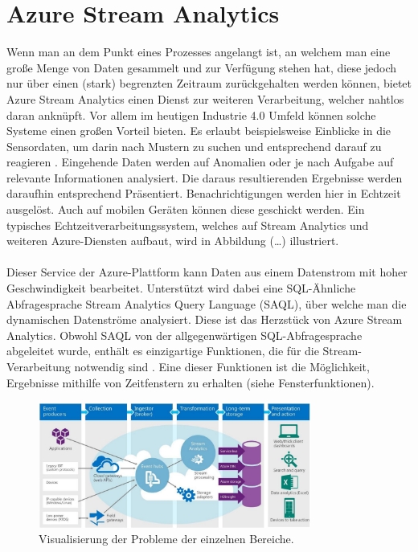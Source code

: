 \section{Azure Stream Analytics}
Wenn man an dem Punkt eines Prozesses angelangt ist, an welchem man eine große Menge von Daten gesammelt und zur Verfügung stehen hat, diese jedoch nur über einen (stark) begrenzten Zeitraum zurückgehalten werden können, bietet Azure Stream Analytics einen Dienst zur weiteren Verarbeitung, welcher nahtlos daran anknüpft. Vor allem im heutigen Industrie 4.0 Umfeld können solche Systeme einen großen Vorteil bieten. Es erlaubt beispielsweise Einblicke in die Sensordaten, um darin nach Mustern zu suchen und entsprechend darauf zu reagieren \cite{Klein.2017}. Eingehende Daten werden auf Anomalien oder je nach Aufgabe auf relevante Informationen analysiert. Die daraus resultierenden Ergebnisse werden daraufhin entsprechend Präsentiert. Benachrichtigungen werden hier in Echtzeit ausgelöst. Auch auf mobilen Geräten können diese geschickt werden. Ein typisches Echtzeitverarbeitungssystem, welches auf Stream Analytics und weiteren Azure-Diensten aufbaut, wird in Abbildung (…) illustriert.\\ \\
Dieser Service der Azure-Plattform kann Daten aus einem Datenstrom mit hoher Geschwindigkeit bearbeitet. Unterstützt wird dabei eine SQL-Ähnliche Abfragesprache Stream Analytics Query Language (SAQL), über welche man die dynamischen Datenströme analysiert. Diese ist das Herzstück von Azure Stream Analytics. Obwohl SAQL von der allgegenwärtigen SQL-Abfragesprache abgeleitet wurde, enthält es einzigartige Funktionen, die für die Stream-Verarbeitung notwendig sind \cite{Prosise.}. Eine dieser Funktionen ist die Möglichkeit, Ergebnisse mithilfe von Zeitfenstern zu erhalten (siehe Fensterfunktionen). 
\begin{figure}[ht]
	\centering
	\includegraphics[width=0.8\textwidth,]{images/StreamAnalytics}
	\caption{Visualisierung der Probleme der einzelnen Bereiche\cite{Laukkanen.2017}.}
	\label{studie}
\end{figure}
